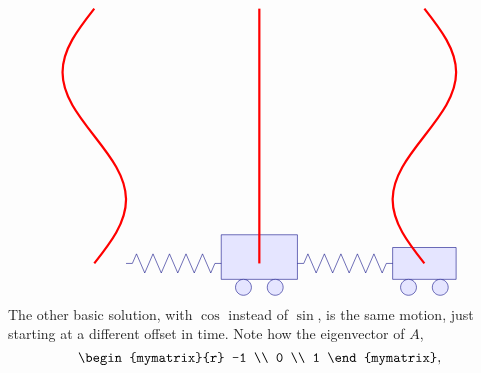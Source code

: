 \begin{solution}
\begin{itemize}
\begin{equation*}
\begin{tikzpicture}[scale=0.8, color=blue!50!black]
\begin{scope}[yshift=-8cm]
\begin{scope}[xshift=5.2cm]
            \draw[fill=blue!10] (1.8,0.5) rectangle (4.2,1.9);
            \draw[fill=blue!10] (2.5,0.25) circle (0.25);
            \draw[fill=blue!10] (3.5,0.25) circle (0.25);
          \end{scope}
          \begin{scope}[xshift=10.4cm]
            \draw[fill=blue!10] (2,0.5) rectangle (4,1.5);
            \draw[fill=blue!10] (2.5,0.25) circle (0.25);
            \draw[fill=blue!10] (3.5,0.25) circle (0.25);
          \end{scope}
          \begin{scope}[xshift=4cm]
            \draw (0,1) -- ++(0.2,0) -- ++(0.13,0.3)
            -- ++(0.26,-0.6) -- ++(0.26,0.6)
            -- ++(0.26,-0.6) -- ++(0.26,0.6)
            -- ++(0.26,-0.6) -- ++(0.26,0.6)
            -- ++(0.26,-0.6) -- ++(0.26,0.6)
            -- ++(0.26,-0.6) -- ++(0.13,0.3)
            -- ++(0.2,0);
          \end{scope}
          \begin{scope}[xshift=9.4cm]
            \draw (0,1) -- ++(0.2,0) -- ++(0.13,0.3)
            -- ++(0.26,-0.6) -- ++(0.26,0.6)
            -- ++(0.26,-0.6) -- ++(0.26,0.6)
            -- ++(0.26,-0.6) -- ++(0.26,0.6)
            -- ++(0.26,-0.6) -- ++(0.26,0.6)
            -- ++(0.26,-0.6) -- ++(0.13,0.3)
            -- ++(0.2,0);
          \end{scope}
        \end{scope}
        \begin{scope}[xshift=3cm,yshift=1cm,rotate=-90]
          \draw[ultra thick,red] (0,0) sin (2,-1) cos (4,0) sin (6,1) cos (8,0);
        \end{scope}
        \begin{scope}[xshift=8.2cm,yshift=1cm,rotate=-90]
          \draw[ultra thick,red] (0,0) sin (2,0) cos (4,0) sin (6,0) cos (8,0);
        \end{scope}
        \begin{scope}[xshift=13.4cm,yshift=1cm,rotate=-90]
          \draw[ultra thick,red] (0,0) sin (2,1) cos (4,0) sin (6,-1) cos (8,0);
        \end{scope}
      \end{tikzpicture}
    \end{equation*}
    The other basic solution, with $\cos$ instead of $\sin$, is the
    same motion, just starting at a different offset in time. Note how
    the eigenvector of $A$,
    \begin{equation*}
      \begin{mymatrix}{r} -1 \\ 0 \\ 1 \end{mymatrix},

\end{equation*}
\end{itemize}
\end{solution}
